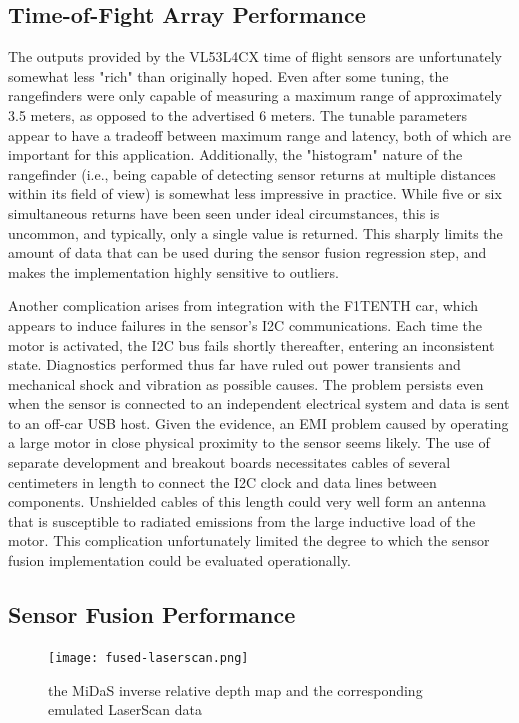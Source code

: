 \documentclass[conference]{IEEEtran}
\begin{document}
\subsection{Time-of-Fight Array Performance}
The outputs provided by the VL53L4CX time of flight sensors are unfortunately
somewhat less "rich" than originally hoped. Even after some tuning, the
rangefinders were only capable of measuring a maximum range of approximately
3.5 meters, as opposed to the advertised 6 meters. The tunable parameters
appear to have a tradeoff between maximum range and latency, both of which
are important for this application. Additionally, the "histogram" nature of the
rangefinder (i.e., being capable of detecting sensor returns at multiple
distances within its field of view) is somewhat less impressive in practice.
While five or six simultaneous returns have been seen under ideal
circumstances, this is uncommon, and typically, only a single value is
returned. This sharply limits the amount of data that can be used during the
sensor fusion regression step, and makes the implementation highly sensitive to
outliers.

Another complication arises from integration with the F1TENTH car, which
appears to induce failures in the sensor's I2C communications. Each time the
motor is activated, the I2C bus fails shortly thereafter, entering an
inconsistent state. Diagnostics performed thus far have ruled out power
transients and mechanical shock and vibration as possible causes. The problem
persists even when the sensor is connected to an independent electrical system
and data is sent to an off-car USB host. Given the evidence, an EMI problem
caused by operating a large motor in close physical proximity to the sensor
seems likely. The use of separate development and breakout boards necessitates
cables of several centimeters in length to connect the I2C clock and data lines
between components. Unshielded cables of this length could very well form an
antenna that is susceptible to radiated emissions from the large inductive load
of the motor. This complication unfortunately limited the degree to which the
sensor fusion implementation could be evaluated operationally.

\subsection{Sensor Fusion Performance}

\begin{figure}
\centering
\texttt{[image: fused-laserscan.png]}
\caption{the MiDaS inverse relative depth map and the corresponding
         emulated LaserScan data}
\label{fig:fused-laserscan}
\end{figure}
\end{document}
